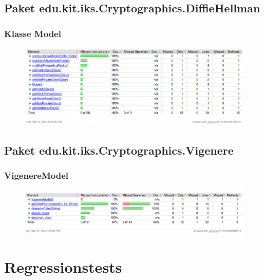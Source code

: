 \documentclass{article}
\begin{document}
  \subsection{Paket edu.kit.iks.Cryptographics.DiffieHellman}
    \subsubsection{Klasse Model}
      \begin{figure}[H]
        \centering
          \includegraphics[width=\textwidth]{resources/coverage_diffiehellman_model}
      \end{figure}

  \subsection{Paket edu.kit.iks.Cryptographics.Vigenere}
    \subsubsection{VigenereModel}
      \begin{figure}[H]
        \centering
          \includegraphics[width=\textwidth]{resources/coverage_vigenere_model}
      \end{figure}
\clearpage


\section{Regressionstests}
\end{document}
